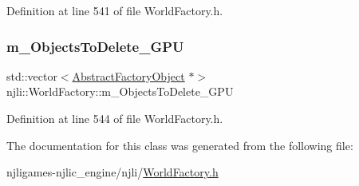 Definition at line 541 of file World\+Factory.\+h.

\mbox{\label{classnjli_1_1_world_factory_acca9a185d035f2608b88c7b9c23251cd}} 
\subsubsection{\texorpdfstring{m\+\_\+\+Objects\+To\+Delete\+\_\+\+G\+PU}{m\_ObjectsToDelete\_GPU}}
{\footnotesize\ttfamily std\+::vector$<$\mbox{\hyperlink{classnjli_1_1_abstract_factory_object}{Abstract\+Factory\+Object}} $\ast$$>$ njli\+::\+World\+Factory\+::m\+\_\+\+Objects\+To\+Delete\+\_\+\+G\+PU\hspace{0.3cm}{\ttfamily [private]}}



Definition at line 544 of file World\+Factory.\+h.



The documentation for this class was generated from the following file\+:\begin{DoxyCompactItemize}
\item 
njligames-\/njlic\+\_\+engine/njli/\mbox{\hyperlink{_world_factory_8h}{World\+Factory.\+h}}\end{DoxyCompactItemize}

